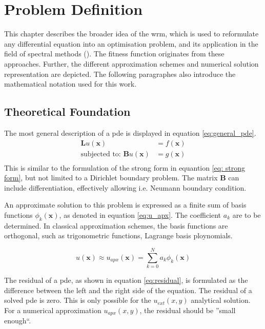 \documentclass[./\jobname.tex]{subfiles}
\begin{document}
\chapter{Problem Definition}
This chapter describes the broader idea of the \gls{wrm}, which is used to reformulate any differential equation into an optimisation problem, and its application in the field of spectral methods (\cite{shen_spectral_2011}). The fitness function originates from these approaches. Further, the different approximation schemes and numerical solution representation are depicted. The following paragraphes also introduce the mathematical notation used for this work. 

\section{Theoretical Foundation}
\label{chap:opt_problem}

The most general description of a \gls{pde} is displayed in equation \ref{eq:general_pde}.
\begin{equation}
\label{eq:general_pde}
\begin{split}
\mathbf{L}u(\mathbf{x}) & = f(\mathbf{x}) \\
\text{subjected to: }\mathbf{B}u(\mathbf{x}) & = g(\mathbf{x}) \\
\end{split}
\end{equation}
This is similar to the formulation of the strong form in equantion \ref{eq: strong form}, but not limited to a Dirichlet boundary problem. The matrix $\mathbf{B}$ can include differentiation, effectively allowing i.e. Neumann boundary condition. 

An approximate solution to this problem is expressed as a finite sum of basis functions $\phi_k(\mathbf{x})$, as denoted in equation \ref{eq:u_apx}. The coefficient $a_k$ are to be determined. In classical approximation schemes, the basis functions are orthogonal, such as trigonometric functions, Lagrange basis ploynomials. 

\begin{equation}
\label{eq:u_apx}
u(\mathbf{x}) \approx u_{apx}(\mathbf{x}) = \sum_{k=0}^{N} a_k \phi_k (\mathbf{x})
\end{equation}

The residual of a \gls{pde}, as shown in equation \ref{eq:residual}, is formulated as the difference between the left and the right side of the equation. The residual of a solved \gls{pde} is zero. This is only possible for the $u_{ext}(x,y)$ analytical solution. For a numerical approximation $u_{apx}(x,y)$, the residual should be ''small enough``. 
\end{document}
